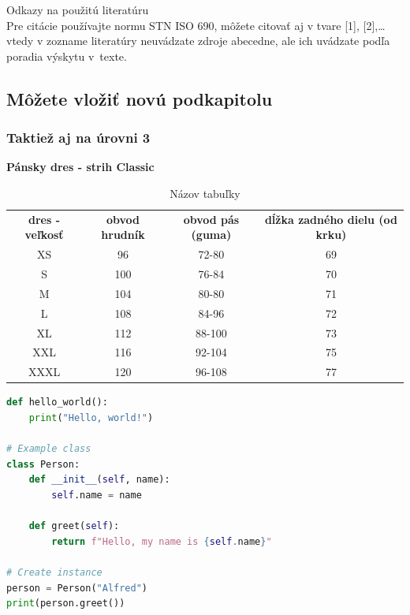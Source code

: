 \newpage
Odkazy na použitú literatúru \cite{book_example} \cite{website_example}
\\Pre citácie používajte normu STN ISO 690, môžete citovať aj v tvare [1], [2],… vtedy v zozname literatúry neuvádzate zdroje abecedne, ale ich uvádzate podľa poradia výskytu v texte. 

\subsection{Môžete vložiť novú podkapitolu}
\subsubsection{Taktiež aj na úrovni 3}

\begin{table}[!h]
    \centering
    \caption{Názov tabuľky}
    {\color{red} \textbf{Pánsky dres - strih Classic}}\\
    \vspace{1em}
    \begin{tabular}{cccc}  
        \textbf{dres - veľkosť} & \textbf{obvod hrudník} & \textbf{obvod pás (guma)} & \textbf{dĺžka zadného dielu (od krku)} \\
        XS & 96 & 72-80 & 69 \\
        S & 100 & 76-84 & 70 \\
        M & 104 & 80-80 & 71 \\
        L & 108 & 84-96 & 72 \\
        XL & 112 & 88-100 & 73 \\
        XXL & 116 & 92-104 & 75 \\
        XXXL & 120 & 96-108 & 77 \\
    \end{tabular}
    \label{tab:example}
\end{table}

\begin{lstlisting}[language=Python, caption={Príklad kódu v Pythone}, label={lst:python-example}]    
def hello_world():
    print("Hello, world!")
        
# Example class
class Person:
    def __init__(self, name):
        self.name = name
    
    def greet(self):
        return f"Hello, my name is {self.name}"

# Create instance
person = Person("Alfred")
print(person.greet())
\end{lstlisting}